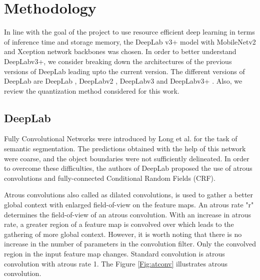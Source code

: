 \chapter{Methodology}

In line with the goal of the project to use resource efficient deep learning in terms of inference time and storage memory, the DeepLab v3+ model with MobileNetv2 \cite{DBLP:journals/corr/abs-1801-04381} and Xception \cite{DBLP:journals/corr/Chollet16a} network backbones was chosen. In order to better understand DeepLabv3+, we consider breaking down the architectures of the previous versions of DeepLab leading upto the current version. The different versions of DeepLab are DeepLab \cite{DBLP:journals/corr/ChenPKMY14}, DeepLabv2 \cite{DBLP:journals/corr/ChenPK0Y16}, DeepLabv3 \cite{DBLP:journals/corr/ChenPSA17} and DeepLabv3+ \cite{DBLP:journals/corr/abs-1802-02611}. Also, we review the quantization method considered for this work.

\section{DeepLab}

Fully Convolutional Networks \cite{7298965} were introduced by Long et al. for the task of semantic segmentation. The predictions obtained with the help of this network were coarse, and the object boundaries were not sufficiently delineated. In order to overcome these difficulties, the authors of DeepLab proposed the use of atrous convolutions and fully-connected Conditional Random Fields (CRF).

Atrous convolutions also called as dilated convolutions, is used to gather a better global context with enlarged field-of-view on the feature maps. An atrous rate "r" determines the field-of-view of an atrous convolution. With an increase in atrous rate, a greater region of a feature map is convolved over which leads to the gathering of more global context. However, it is worth noting that there is no increase in the number of parameters in the convolution filter. Only the convolved region in the input feature map changes. Standard convolution is atrous convolution with atrous rate 1. The Figure \ref{Fig:atconv} illustrates atrous convolution. 

